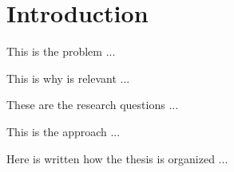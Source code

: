 \chapter{Introduction}
\label{cha:intro}
\vspace{0.4 cm}

This is the problem ...

This is why is relevant ...

These are the research questions ...

This is the approach ...

Here is written how the thesis is organized ...
